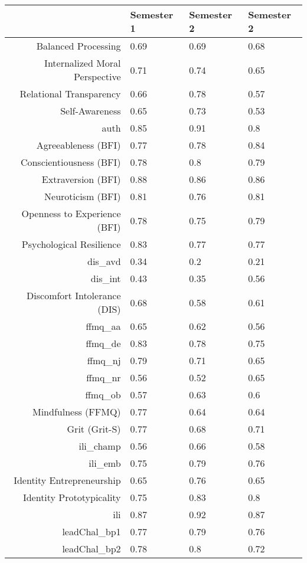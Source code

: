 \begin{table}[ht]
\centering
\begin{tabular}{rlll}
  \hline
 & Semester 1 & Semester 2 & Semester 2 \\ 
  \hline
Balanced Processing & 0.69 & 0.69 & 0.68 \\ 
  Internalized Moral Perspective & 0.71 & 0.74 & 0.65 \\ 
  Relational Transparency & 0.66 & 0.78 & 0.57 \\ 
  Self-Awareness & 0.65 & 0.73 & 0.53 \\ 
  auth & 0.85 & 0.91 & 0.8 \\ 
  Agreeableness (BFI) & 0.77 & 0.78 & 0.84 \\ 
  Conscientiousness (BFI) & 0.78 & 0.8 & 0.79 \\ 
  Extraversion (BFI) & 0.88 & 0.86 & 0.86 \\ 
  Neuroticism (BFI) & 0.81 & 0.76 & 0.81 \\ 
  Openness to Experience (BFI) & 0.78 & 0.75 & 0.79 \\ 
  Psychological Resilience & 0.83 & 0.77 & 0.77 \\ 
  dis\_avd & 0.34 & 0.2 & 0.21 \\ 
  dis\_int & 0.43 & 0.35 & 0.56 \\ 
  Discomfort Intolerance (DIS) & 0.68 & 0.58 & 0.61 \\ 
  ffmq\_aa & 0.65 & 0.62 & 0.56 \\ 
  ffmq\_de & 0.83 & 0.78 & 0.75 \\ 
  ffmq\_nj & 0.79 & 0.71 & 0.65 \\ 
  ffmq\_nr & 0.56 & 0.52 & 0.65 \\ 
  ffmq\_ob & 0.57 & 0.63 & 0.6 \\ 
  Mindfulness (FFMQ) & 0.77 & 0.64 & 0.64 \\ 
  Grit (Grit-S) & 0.77 & 0.68 & 0.71 \\ 
  ili\_champ & 0.56 & 0.66 & 0.58 \\ 
  ili\_emb & 0.75 & 0.79 & 0.76 \\ 
  Identity Entrepreneurship & 0.65 & 0.76 & 0.65 \\ 
  Identity Prototypicality & 0.75 & 0.83 & 0.8 \\ 
  ili & 0.87 & 0.92 & 0.87 \\ 
  leadChal\_bp1 & 0.77 & 0.79 & 0.76 \\ 
  leadChal\_bp2 & 0.78 & 0.8 & 0.72 \\ 

\end{tabular}
\end{table}
